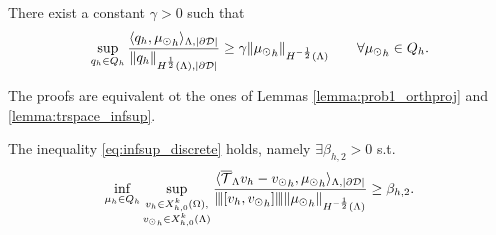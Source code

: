 \begin{lemma}\label{infsup_avr_trspace}
There exist a constant $\gamma >0$ such that
\begin{equation*}
\sup_{\substack{q_h \in Q_h}} \frac{\langle q_h , {\mu_{\odot}}_h \rangle_{\Lambda, |\partial\mathcal{D}|}}{ \|q_h\|_{H^{\frac 12}(\Lambda),|\partial\mathcal{D}|}} \geq \gamma \|{\mu_{\odot}}_h\|_{H^{-\frac 12}(\Lambda)} \qquad \forall {\mu_{\odot}}_h \in Q_h.
\end{equation*} 
\end{lemma}
The proofs are equivalent ot the ones of Lemmas \ref{lemma:prob1_orthproj} and \ref{lemma:trspace_infsup}.
\begin{theorem} The inequality \eqref{eq:infsup_discrete} holds, namely 
$\exists \beta_{h,2} >0$ s.t.
\begin{equation}
\inf_{\mu_h \in Q_h} 
\sup_{\substack{v_h \in X_{h,0}^k(\Omega),\\ {v_{\odot}}_h \in X_{h,0}^k(\Lambda)} }\frac{\langle {\overline{\mathcal{T}}_\Lambda} v_h -  {v_{\odot}}_h, {\mu_{\odot}}_h \rangle _{\Lambda,|\partial\mathcal{D}|} } {{\left\vert\kern-0.25ex\left\vert\kern-0.25ex\left\vert [v_h, {v_{\odot}}_h] \right\vert\kern-0.25ex\right\vert\kern-0.25ex\right\vert} \|{\mu_{\odot}}_h\|_{H^{-\frac 12 }(\Lambda)} } 
\geq \beta_{h,2}. 
\end{equation}
\end{theorem}
